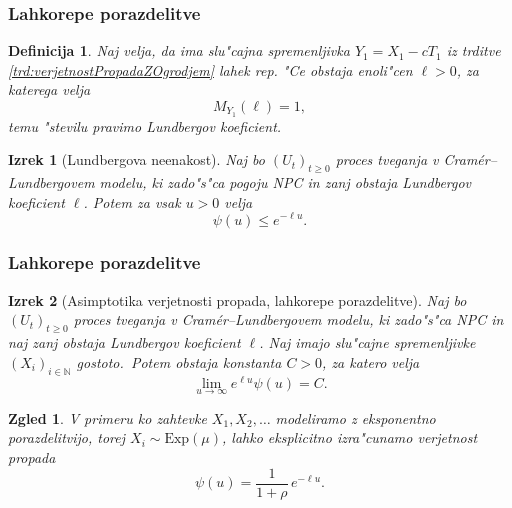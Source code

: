 \documentclass[]{beamer} %
\theoremstyle{plain}
\newtheorem{izrek}{Izrek}
\newtheorem{definicija}{Definicija}
\newtheorem{zgled}{Zgled}
\newcommand{\N}{\mathbb{N}}
\begin{document}
\begin{frame}
  \frametitle{Lahkorepe porazdelitve}
  \begin{definicija}
    Naj velja, da ima slu"cajna spremenljivka $Y_1 = X_1 - cT_1$ iz trditve \ref{trd:verjetnostPropadaZOgrodjem} 
    lahek rep. "Ce obstaja enoli"cen $\ell > 0$, za katerega velja
    \begin{equation*}
        M_{Y_1}(\ell)  = 1,
    \end{equation*}
    temu "stevilu pravimo \textit{Lundbergov koeficient}.
    \label{def:LundbergovKoeficient}
  \end{definicija}
  \pause
  \begin{izrek}[Lundbergova neenakost]
    Naj bo $(U_t)_{t\geq0}$ proces tveganja v Cramér--Lundbergovem modelu, ki zado"s"ca pogoju NPC in 
     zanj obstaja Lundbergov koeficient $\ell$. Potem za vsak $u>0$ velja
    \begin{equation*}
        \psi(u) \leq e^{-\ell u}.
    \end{equation*}
    \label{izr:LundbergovaNeenakost}
  \end{izrek}
\end{frame}

\begin{frame}
  \frametitle{Lahkorepe porazdelitve}
  \begin{izrek}[Asimptotika verjetnosti propada, lahkorepe porazdelitve]
    Naj bo $(U_t)_{t\geq0}$ proces tveganja v Cramér--Lundbergovem modelu, ki zado"s"ca NPC in 
    naj zanj obstaja Lundbergov koeficient $\ell$. Naj imajo slu"cajne spremenljivke 
    $(X_i)_{i\in\N}$ gostoto.\ Potem obstaja konstanta $C>0$, za katero velja 
    \begin{equation*}
        \lim_{u\to\infty}e^{\ell u}\psi(u) = C.
    \end{equation*}
    \label{izr:CramerjevaMeja}
\end{izrek}
\pause
\begin{zgled}
  V primeru ko zahtevke $X_1, X_2, \dots$ modeliramo z eksponentno porazdelitvijo, torej $X_i\sim\text{Exp}(\mu)$,
  lahko eksplicitno izra"cunamo verjetnost propada
  \begin{equation*}
    \psi(u) =  \frac{1}{1+\rho}\,e^{-\ell u}.
    \label{eq:eksplicitnaVerjetnostPropadaExp}
\end{equation*}
\end{zgled}
\end{frame}
\end{document}
